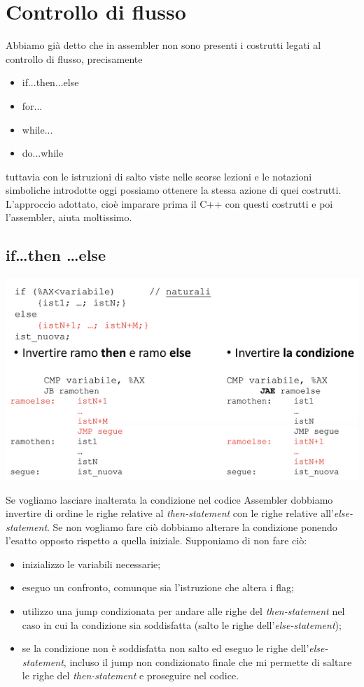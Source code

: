 \documentclass[11pt]{report}
\begin{document}
\section{Controllo di flusso}
Abbiamo già detto che in assembler non sono presenti i costrutti legati al controllo di flusso, precisamente
\begin{itemize}
\item if...then...else
\item for...
\item while...
\item do...while
\end{itemize}
tuttavia con le istruzioni di salto viste nelle scorse lezioni e le notazioni simboliche introdotte oggi possiamo ottenere la stessa azione di quei costrutti. L'approccio adottato, cioè imparare prima il C++ con questi costrutti e poi l'assembler, aiuta moltissimo.
\subsection{if\dots then \dots else}
\begin{center}
\includegraphics{img/50.PNG}
\end{center}
Se vogliamo lasciare inalterata la condizione nel codice Assembler dobbiamo invertire di ordine le righe relative al \emph{then-statement} con le righe relative all'\emph{else-statement}. Se non vogliamo fare ciò dobbiamo alterare la condizione ponendo l'esatto opposto rispetto a quella iniziale. Supponiamo di non fare ciò:
\begin{itemize}
\item inizializzo le variabili necessarie;
\item eseguo un confronto, comunque sia l'istruzione che altera i flag;
\item utilizzo una jump condizionata per andare alle righe del \emph{then-statement} nel caso in cui la condizione sia soddisfatta (salto le righe dell'\emph{else-statement});
\item se la condizione non è soddisfatta non salto ed eseguo le righe dell'\emph{else-statement}, incluso il jump non condizionato finale che mi permette di saltare le righe del \emph{then-statement} e proseguire nel codice.
\end{itemize}
\end{document}
